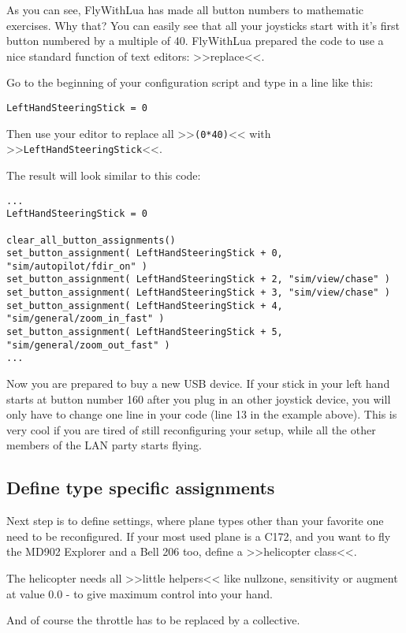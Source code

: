 \documentclass[11pt,parskip=half,a4paper]{scrartcl}
\begin{document}
As you can see, FlyWithLua has made all button numbers to mathematic exercises. Why that? You can easily see that all your joysticks start with it's first button numbered by a multiple of 40. FlyWithLua prepared the code to use a nice standard function of text editors: >>replace<<.

Go to the beginning of your configuration script and type in a line like this:

\verb|LeftHandSteeringStick = 0|

Then use your editor to replace all >>\verb|(0*40)|<< with >>\verb|LeftHandSteeringStick|<<.

The result will look similar to this code:

\begin{lstlisting}[firstnumber=12]
...
LeftHandSteeringStick = 0

clear_all_button_assignments()
set_button_assignment( LeftHandSteeringStick + 0, "sim/autopilot/fdir_on" )
set_button_assignment( LeftHandSteeringStick + 2, "sim/view/chase" )
set_button_assignment( LeftHandSteeringStick + 3, "sim/view/chase" )
set_button_assignment( LeftHandSteeringStick + 4, "sim/general/zoom_in_fast" )
set_button_assignment( LeftHandSteeringStick + 5, "sim/general/zoom_out_fast" )
...
\end{lstlisting}

Now you are prepared to buy a new USB device. If your stick in your left hand starts at button number 160 after you plug in an other joystick device, you will only have to change one line in your code (line 13 in the example above). This is very cool if you are tired of still reconfiguring your setup, while all the other members of the LAN party starts flying.

\subsection{Define type specific assignments}

Next step is to define settings, where plane types other than your favorite one need to be reconfigured. If your most used plane is a C172, and you want to fly the MD902 Explorer and a Bell 206 too, define a >>helicopter class<<.

The helicopter needs all >>little helpers<< like nullzone, sensitivity or augment at value 0.0 - to give maximum control into your hand.

And of course the throttle has to be replaced by a collective.
\end{document}
